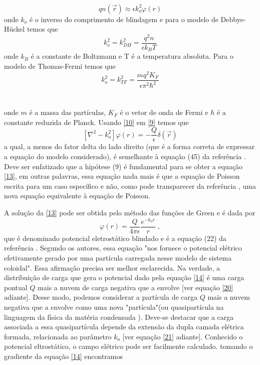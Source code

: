 \documentclass[brazilian,10.7pt,a4paper]{article}
\begin{document}
\begin{multicols}{2}
\\
\begin{equation}\label{10}
qn(\vec{r})\approx \epsilon k^{2}_{o}\varphi(r)
\end{equation}
onde $k_{o}$ é o inverso do comprimento de blindagem e para o modelo de Debbye-Hückel temos que
\\
\begin{equation}\label{11}
k^{2}_{o}=k^{2}_{DH}=\frac{q^{2}n}{\epsilon k_{B}T}
\end{equation}
onde $k_{B}$ é a constante de Boltzmann e T é a temperatura absoluta. Para o modelo de Thomas-Fermi temos que
\\
\begin{equation}\label{12}
k^{2}_{o}=k^{2}_{TF}=\frac{mq^{2}K_{F}}{\epsilon\pi^{2}\hbar^{2}}
\end{equation}
\\
\\
onde $m$ é a massa das partículas, $K_{F}$ é o vetor de onda de Fermi e $\hbar$ é a constante reduzida de Planck. Usando \eqref{10} em \eqref{9} temos que
\\
\begin{equation}\label{13}
[\nabla^{2}-k^{2}_{o}]\varphi(r)=-\frac{Q}{\epsilon}\delta(\vec{r})
\end{equation}
a qual, a menos do fator delta do lado direito (que é a forma correta de expressar a equação do modelo considerado), é semelhante à equação (45) da referência \cite{ramos}. Deve ser enfatizado que a hipótese (9) é fundamental para se obter a equação \eqref{13}, em outras palavras, essa equação nada mais é que a equação de Poisson escrita para um caso específico e não, como pode transparecer da referência \cite{ramos}, uma nova equação equivalente à equação de Poisson.
\par A solução da \eqref{13} pode ser obtida pelo método das funções de Green e é dada por 
\\
\begin{equation}\label{14}
\varphi(r)=\frac{Q}{4\pi\epsilon}\frac{e^{-k_{o}r}}{r}\;,
\end{equation}
que é denominado potencial eletrostático blindado e é a equação (22) da referência \cite{ramos}. Segundo os autores, essa equação "nos fornece o potencial elétrico efetivamente gerado por uma partícula carregada nesse modelo de sistema coloidal". Essa afirmação precisa ser melhor esclarecida. Na verdade, a distribuição de carga que gera o potencial dado pela equação \eqref{14} é uma carga pontual $Q$ mais a nuvem de carga negativa que a envolve [ver equação \eqref{20} adiante]. Desse modo, podemos considerar a partícula de carga $Q$ mais a nuvem negativa que a envolve como uma nova "partícula"(ou quasipartícula na linguagem da física da matéria condensada \cite{ribeiro}). Deve-se destacar que a carga associada a essa quasipartícula depende da extensão da dupla camada elétrica formada, relacionada ao parâmetro $k_{o}$ [ver equação \eqref{21} adiante]. Conhecido o potencial eltrostático, o campo elétrico pode ser facilmente calculado. tomando o gradiente da equação \eqref{14} encontramos

\end{multicols}
\end{document}
